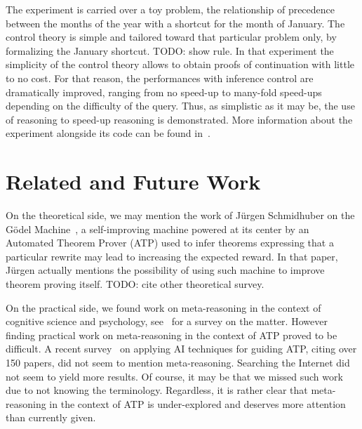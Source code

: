 \documentclass{easychair}
\begin{document}
The experiment is carried over a toy problem, the relationship of
precedence between the months of the year with a shortcut for the
month of January.  The control theory is simple and tailored toward
that particular problem only, by formalizing the January shortcut.
TODO: show rule.
In that experiment the simplicity of the control theory
allows to obtain proofs of continuation with little to no cost.  For
that reason, the performances with inference control are dramatically
improved, ranging from no speed-up to many-fold speed-ups depending on
the difficulty of the query.  Thus, as simplistic as it may be, the
use of reasoning to speed-up reasoning is demonstrated.  More
information about the experiment alongside its code can be found
in~\cite{TODO}.






\section{Related and Future Work}

On the theoretical side, we may mention the work of J\"urgen
Schmidhuber on the G\"odel Machine~\cite{TODO}, a self-improving
machine powered at its center by an Automated Theorem Prover (ATP)
used to infer theorems expressing that a particular rewrite may lead
to increasing the expected reward.  In that paper, J\"urgen actually
mentions the possibility of using such machine to improve theorem
proving itself.  TODO: cite other theoretical survey.

On the practical side, we found work on meta-reasoning in the context
of cognitive science and psychology, see~\cite{TODO} for a survey on
the matter.  However finding practical work on meta-reasoning in the
context of ATP proved to be difficult.  A recent survey~\cite{TODO} on
applying AI techniques for guiding ATP, citing over 150 papers, did
not seem to mention meta-reasoning.  Searching the Internet did not
seem to yield more results.  Of course, it may be that we missed such
work due to not knowing the terminology.  Regardless, it is rather
clear that meta-reasoning in the context of ATP is under-explored and
deserves more attention than currently given.\\
\end{document}

